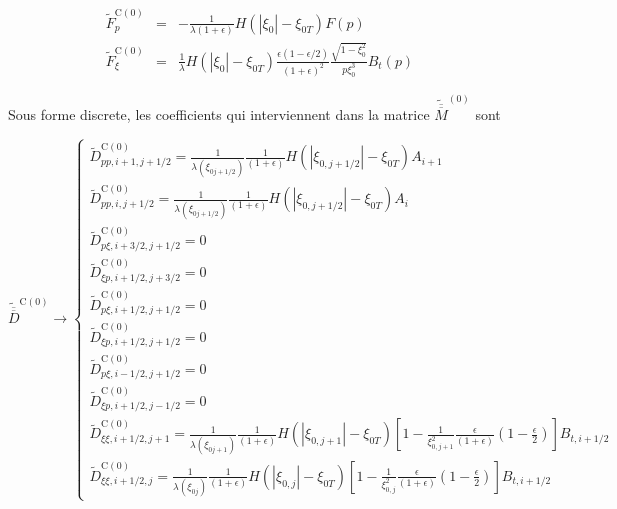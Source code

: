 \begin{eqnarray*}
\widetilde{F}_{p}^{\text{C}(0)} & = & -\frac{1}{\lambda\left(1+\epsilon\right)}H(|\xi_{0}|-\xi_{0T})F(p)\\
\widetilde{F}_{\xi}^{\text{C}(0)} & = & \frac{1}{\lambda}H(|\xi_{0}|-\xi_{0T})\frac{\epsilon\left(1-\epsilon/2\right)}{\left(1+\epsilon\right)^{2}}\frac{\sqrt{1-\xi_{0}^{2}}}{p\xi_{0}^{3}}B_{t}(p)\end{eqnarray*}


Sous forme discrete, les coefficients qui interviennent dans la matrice
$\widetilde{\overline{\overline{M}}}^{\left(0\right)}$ sont

\[
\widetilde{\overline{\overline{D}}}^{\text{C}(0)}\rightarrow\left\{ \begin{array}{l}
\widetilde{D}_{pp,i+1,j+1/2}^{\text{C}(0)}=\frac{1}{\lambda\left(\xi_{0j+1/2}\right)}\frac{1}{\left(1+\epsilon\right)}H(|\xi_{0,j+1/2}|-\xi_{0T})A_{i+1}\\
\widetilde{D}_{pp,i,j+1/2}^{\text{C}(0)}=\frac{1}{\lambda\left(\xi_{0j+1/2}\right)}\frac{1}{\left(1+\epsilon\right)}H(|\xi_{0,j+1/2}|-\xi_{0T})A_{i}\\
\widetilde{D}_{p\xi,i+3/2,j+1/2}^{\text{C}\left(0\right)}=0\\
\widetilde{D}_{\xi p,i+1/2,j+3/2}^{\text{C}\left(0\right)}=0\\
\widetilde{D}_{p\xi,i+1/2,j+1/2}^{\text{C}\left(0\right)}=0\\
\widetilde{D}_{\xi p,i+1/2,j+1/2}^{\text{C}\left(0\right)}=0\\
\widetilde{D}_{p\xi,i-1/2,j+1/2}^{\text{C}\left(0\right)}=0\\
\widetilde{D}_{\xi p,i+1/2,j-1/2}^{\text{C}\left(0\right)}=0\\
\widetilde{D}_{\xi\xi,i+1/2,j+1}^{\text{C}(0)}=\frac{1}{\lambda\left(\xi_{0j+1}\right)}\frac{1}{\left(1+\epsilon\right)}H(|\xi_{0,j+1}|-\xi_{0T})\left[1-\frac{1}{\xi_{0,j+1}^{2}}\frac{\epsilon}{\left(1+\epsilon\right)}\left(1-\frac{\epsilon}{2}\right)\right]B_{t,i+1/2}\\
\widetilde{D}_{\xi\xi,i+1/2,j}^{\text{C}(0)}=\frac{1}{\lambda\left(\xi_{0j}\right)}\frac{1}{\left(1+\epsilon\right)}H(|\xi_{0,j}|-\xi_{0T})\left[1-\frac{1}{\xi_{0,j}^{2}}\frac{\epsilon}{\left(1+\epsilon\right)}\left(1-\frac{\epsilon}{2}\right)\right]B_{t,i+1/2}\end{array}\right.\]

